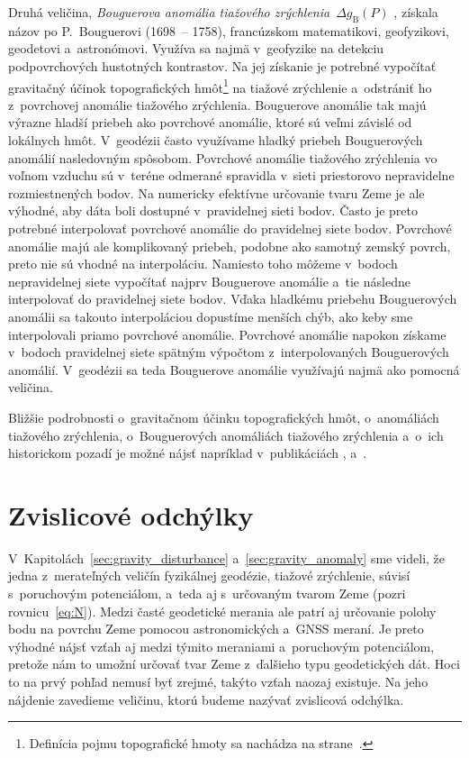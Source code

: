 \documentclass[a4paper, 12pt]{book}
\begin{document}
Druhá veličina, \emph{Bouguerova anomália tiažového zrýchlenia}~$\Delta 
g_{\mathrm{B}}(P)$ \parencite{MoritzPhysicalGeodesy}, získala názov po 
P.~Bouguerovi (1698~-- 1758), francúzskom matematikovi, geofyzikovi, geodetovi 
a~astronómovi.  Využíva sa najmä v~geofyzike na detekciu podpovrchových 
hustotných kontrastov.  Na jej získanie je potrebné vypočítať gravitačný účinok 
topografických hmôt\footnote{Definícia pojmu topografické hmoty sa nachádza na 
strane~\pageref{def:topographic_masses}.} na tiažové zrýchlenie a~odstrániť ho 
z~povrchovej anomálie tiažového zrýchlenia.  Bouguerove anomálie tak majú 
výrazne hladší priebeh ako povrchové anomálie, ktoré sú veľmi závislé od 
lokálnych hmôt.  V~geodézii často využívame hladký priebeh Bouguerových 
anomálií nasledovným spôsobom.  Povrchové anomálie tiažového zrýchlenia vo 
voľnom vzduchu sú v~teréne odmerané spravidla v~sieti priestorovo nepravidelne 
rozmiestnených bodov.  Na numericky efektívne určovanie tvaru Zeme je ale 
výhodné, aby dáta boli dostupné v~pravidelnej sieti bodov.  Často je preto 
potrebné interpolovať povrchové anomálie do pravidelnej siete bodov.  Povrchové 
anomálie majú ale komplikovaný priebeh, podobne ako samotný zemský povrch, 
preto nie sú vhodné na interpoláciu.  Namiesto toho môžeme v~bodoch 
nepravidelnej siete vypočítať najprv Bouguerove anomálie a~tie následne 
interpolovať do pravidelnej siete bodov.  Vďaka hladkému priebehu Bouguerových 
anomálii sa takouto interpoláciou dopustíme menších chýb, ako keby sme 
interpolovali priamo povrchové anomálie.  Povrchové anomálie napokon získame 
v~bodoch pravidelnej siete spätným výpočtom z~interpolovaných Bouguerových 
anomálií.  V~geodézii sa teda Bouguerove anomálie využívajú najmä ako pomocná 
veličina.

Bližšie podrobnosti o~gravitačnom účinku topografických hmôt, o~anomáliách 
tiažového zrýchlenia, o~Bouguerových anomáliách tiažového zrýchlenia a~o~ich 
historickom pozadí je možné nájsť napríklad v~publikáciách 
\textcite{Meurers2017}, \textcite{Mikuska2017} a~\textcite{Vajda2020}.





\section{Zvislicové odchýlky}
\label{sec:deflections}

V~Kapitolách~\ref{sec:gravity_disturbance} a~\ref{sec:gravity_anomaly} sme 
videli, že jedna z~merateľných veličín fyzikálnej geodézie, tiažové zrýchlenie, 
súvisí s~poruchovým potenciálom, a~teda aj s~určovaným tvarom Zeme (pozri 
rovnicu~\ref{eq:N}).  Medzi časté geodetické merania ale patrí aj určovanie 
polohy bodu na povrchu Zeme pomocou astronomických a~GNSS meraní.  Je preto 
výhodné nájsť vzťah aj medzi týmito meraniami a~poruchovým potenciálom, pretože 
nám to umožní určovať tvar Zeme z~ďalšieho typu geodetických dát.  Hoci to na 
prvý pohľad nemusí byť zrejmé, takýto vzťah naozaj existuje.  Na jeho nájdenie 
zavedieme veličinu, ktorú budeme nazývať zvislicová odchýlka.
\end{document}
